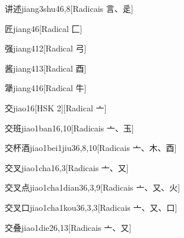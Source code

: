 \begin{entry}{讲述}{jiang3shu4}{6,8}[Radicais ⾔、⾡]
\end{entry}

\begin{entry}{匠}{jiang4}{6}[Radical ⼕]
\end{entry}

\begin{entry}{强}{jiang4}{12}[Radical ⼸]
\end{entry}

\begin{entry}{酱}{jiang4}{13}[Radical ⾣]
\end{entry}

\begin{entry}{犟}{jiang4}{16}[Radical ⽜]
\end{entry}

\begin{entry}{交}{jiao1}{6}[HSK 2][Radical ⼇]
\end{entry}

\begin{entry}{交班}{jiao1ban1}{6,10}[Radicais ⼇、⽟]
\end{entry}

\begin{entry}{交杯酒}{jiao1bei1jiu3}{6,8,10}[Radicais ⼇、⽊、⾣]
\end{entry}

\begin{entry}{交叉}{jiao1cha1}{6,3}[Radicais ⼇、⼜]
\end{entry}

\begin{entry}{交叉点}{jiao1cha1dian3}{6,3,9}[Radicais ⼇、⼜、⽕]
\end{entry}

\begin{entry}{交叉口}{jiao1cha1kou3}{6,3,3}[Radicais ⼇、⼜、⼝]
\end{entry}

\begin{entry}{交叠}{jiao1die2}{6,13}[Radicais ⼇、⼜]
\end{entry}

